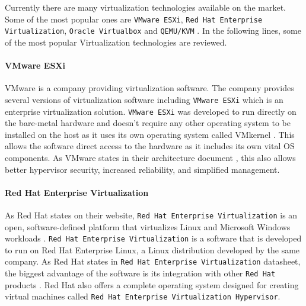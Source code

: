 Currently there are many virtualization technologies available on the market. Some of the most popular ones are \texttt{VMware ESXi}, \texttt{Red Hat Enterprise Virtualization}, \texttt{Oracle Virtualbox} and \texttt{QEMU/KVM} \cite{virtualizationpopular}. In the following lines, some of the most popular Virtualization technologies are reviewed.
\paragraph{VMware ESXi}
VMware is a company providing virtualization software. The company provides several versions of virtualization software including \texttt{VMware ESXi} which is an enterprise virtualization solution. \texttt{VMware ESXi} was developed to run directly on the bare-metal hardware and doesn't require any other operating system to be installed on the host as it uses its own operating system called VMkernel \cite{vmwarearch}. This allows the software direct access to the hardware as it includes its own vital OS components. As VMware states in their architecture document \cite{vmwarearch}, this also allows better hypervisor security, increased reliability,
and simplified management. 
\paragraph{Red Hat Enterprise Virtualization}
As Red Hat states on their website, \texttt{Red Hat Enterprise Virtualization} is an open, software-defined platform that virtualizes Linux and Microsoft Windows workloads \cite{rhev}. \texttt{Red Hat Enterprise Virtualization} is a software that is developed to run on Red Hat Enterprise Linux, a Linux distribution developed by the same company. As Red Hat states in \texttt{Red Hat Enterprise Virtualization} datasheet, the biggest advantage of the software is its integration with other \texttt{Red Hat} products \cite{rhdatasheet}. Red Hat also offers a complete operating system designed for creating virtual machines called \texttt{Red Hat Enterprise Virtualization Hypervisor}.

